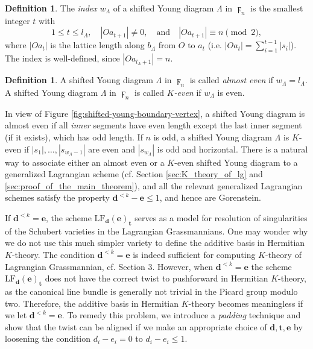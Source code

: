 \documentclass[a4paper]{amsart}
\theoremstyle{plain}
\theoremstyle{definition}
\newtheorem{definition}[theorem]{Definition}
\numberwithin{equation}{section}
\newcommand{\LF}{\mathrm{LF}}
\begin{document}
\begin{definition}\label{def:shifted_young_index}
    The \textit{index} $w_{\Lambda}$ of a shifted Young diagram $\Lambda$ in $\digamma_n$ is the smallest integer $t$ with
    \[
        1\leq t \leq l_\Lambda, \quad |Oa_{t+1}|\neq 0, \quad \text{and} \quad |Oa_{t+1}| \equiv n \pmod 2,
    \]
    where $|Oa_t|$ is the lattice length along $b_\Lambda$ from $O$ to $a_t$ (i.e. $|Oa_t|=\sum_{i=1}^{t-1}|s_i|$).
    The index is well-defined, since $|Oa_{l_\Lambda+1}| = n$.
\end{definition}
\begin{definition}
    A shifted Young diagram $\Lambda$ in $\digamma_{n}$ is called \textit{almost even} if $w_{\Lambda}=l_\Lambda$. A shifted Young diagram $\Lambda$ in $\digamma_{n}$ is called \textit{$K$-even} if $w_{\Lambda}$ is even.
\end{definition}
In view of Figure \ref{fig:shifted-young-boundary-vertex}, a shifted Young diagram is almost even if all \textit{inner} segments have even length except the last inner segment (if it exists), which has odd length. If $n$ is odd, a shifted Young diagram $\Lambda$ is $K$-even if $|s_1|, \ldots, |s_{w_\Lambda -1}|$ are even and $|s_{w_\Lambda}|$ is odd and horizontal. There is a natural way to associate either an almost even or a $K$-even shifted Young diagram to a generalized Lagrangian scheme (cf. Section \ref{sec:K_theory_of_lg} and \ref{sec:proof_of_the_main_theorem}), and all the relevant generalized Lagrangian schemes satisfy the property $\mathbf{d}^{< k} - \mathbf{e} \leq 1$, and hence are Gorenstein.



If $\mathbf{d}^{< k} = \mathbf{e}$, the scheme $\LF_{\mathbf{d}}(\mathbf{e})_{\mathbf{t}}$ serves as a model for resolution of singularities of the Schubert varieties in the Lagrangian Grassmannians. One may wonder why we do not use this much simpler variety to define the additive basis in Hermitian $K$-theory. The condition $\mathbf{d}^{< k} = \mathbf{e}$ is indeed sufficient for computing $K$-theory of Lagrangian Grassmannian, cf. Section 3. However, when $\mathbf{d}^{< k} = \mathbf{e}$ the scheme $\LF_{\mathbf{d}}(\mathbf{e})_{\mathbf{t}}$ does not have the correct twist to pushforward in Hermitian $K$-theory, as the canonical line bundle is generally not trivial in the Picard group modulo two. Therefore, the additive basis in Hermitian $K$-theory becomes meaningless if we let $\mathbf{d}^{< k} = \mathbf{e}$. To remedy this problem, we introduce a \textit{padding} technique and show that the twist can be aligned if we make an appropriate choice of $\mathbf{d},\mathbf{t},\mathbf{e}$ by loosening the condition $ d_i -e_i = 0$ to $ d_i -e_i \leq 1$.
\end{document}
